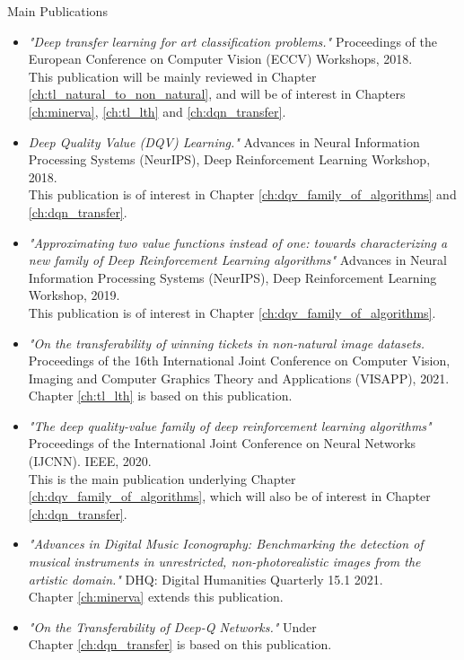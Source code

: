 \begin{remark}{Main Publications}
\begin{itemize}
	\item \citet{sabatelli2018deep} \textit{"Deep transfer learning for art classification problems."} Proceedings of the European Conference on Computer Vision (ECCV) Workshops, 2018.
	\\ This publication will be mainly reviewed in Chapter \ref{ch:tl_natural_to_non_natural}, and will be of interest in Chapters \ref{ch:minerva}, \ref{ch:tl_lth} and \ref{ch:dqn_transfer}.

	\item \citet{sabatelli2018deepqv} \textit{Deep Quality Value (DQV) Learning."} Advances in Neural Information Processing Systems (NeurIPS), Deep Reinforcement Learning Workshop, 2018.
	\\ This publication is of interest in Chapter \ref{ch:dqv_family_of_algorithms} and \ref{ch:dqn_transfer}.

	\item \citet{sabatelli2019approximating}  \textit{"Approximating two value functions instead of one: towards characterizing a new family of Deep Reinforcement Learning algorithms"} Advances in Neural Information Processing Systems (NeurIPS), Deep Reinforcement Learning Workshop, 2019. \\
	This publication is of interest in Chapter \ref{ch:dqv_family_of_algorithms}.
	
	\item \citet{sabatelli2020transferability} \textit{"On the transferability of winning tickets in non-natural image datasets.} Proceedings of the 16th International Joint Conference on Computer Vision, Imaging and Computer Graphics Theory and Applications (VISAPP), 2021.
	\\ Chapter \ref{ch:tl_lth} is based on this publication.

	\item \citet{sabatelli2020deep} \textit{"The deep quality-value family of deep reinforcement learning algorithms"} Proceedings of the International Joint Conference on Neural Networks (IJCNN). IEEE, 2020.
	\\ This is the main publication underlying Chapter \ref{ch:dqv_family_of_algorithms}, which will also be of interest in Chapter \ref{ch:dqn_transfer}.

	\item \citet{sabatelli2021advances} \textit{"Advances in Digital Music Iconography: Benchmarking the detection of musical instruments in unrestricted, non-photorealistic images from the artistic domain."} DHQ: Digital Humanities Quarterly 15.1 2021.
	\\ Chapter \ref{ch:minerva} extends this publication.

	\item \citet{sabatelli2021transferability} \textit{"On the Transferability of Deep-Q Networks."} Under \\
	Chapter \ref{ch:dqn_transfer} is based on this publication.
 
\end{itemize}
\end{remark}

